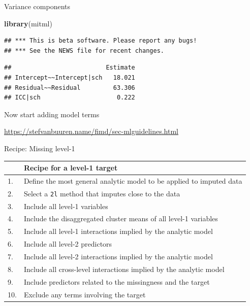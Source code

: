 \documentclass[ignorenonframetext,aspectratio=43]{beamer}
\newenvironment{Shaded}{\begin{snugshade}}{\end{snugshade}}
\newcommand{\DataTypeTok}[1]{\textcolor[rgb]{0.13,0.29,0.53}{#1}}
\newcommand{\KeywordTok}[1]{\textcolor[rgb]{0.13,0.29,0.53}{\textbf{#1}}}
\newcommand{\NormalTok}[1]{#1}
\newcommand{\OperatorTok}[1]{\textcolor[rgb]{0.81,0.36,0.00}{\textbf{#1}}}
\newcommand{\OtherTok}[1]{\textcolor[rgb]{0.56,0.35,0.01}{#1}}
\begin{document}
\begin{frame}[fragile]{Variance components}
\protect\hypertarget{variance-components}{}

\begin{Shaded}
\begin{Highlighting}[]
\KeywordTok{library}\NormalTok{(mitml)}
\end{Highlighting}
\end{Shaded}

\begin{verbatim}
## *** This is beta software. Please report any bugs!
## *** See the NEWS file for recent changes.
\end{verbatim}

\begin{Shaded}
\end{Shaded}

\begin{verbatim}
##                          Estimate
## Intercept~~Intercept|sch   18.021
## Residual~~Residual         63.306
## ICC|sch                     0.222
\end{verbatim}

\end{frame}

\begin{frame}{Now start adding model terms}
\protect\hypertarget{now-start-adding-model-terms}{}

\url{https://stefvanbuuren.name/fimd/sec-mlguidelines.html}

\end{frame}

\begin{frame}[fragile]{Recipe: Missing level-1}
\protect\hypertarget{recipe-missing-level-1}{}

\begin{longtable}[]{@{}ll@{}}
\toprule
& Recipe for a level-1 target\tabularnewline
\midrule
\endhead
1. & Define the most general analytic model to be applied to imputed
data\tabularnewline
2. & Select a \texttt{2l} method that imputes close to the
data\tabularnewline
3. & Include all level-1 variables\tabularnewline
4. & Include the disaggregated cluster means of all level-1
variables\tabularnewline
5. & Include all level-1 interactions implied by the analytic
model\tabularnewline
6. & Include all level-2 predictors\tabularnewline
7. & Include all level-2 interactions implied by the analytic
model\tabularnewline
8. & Include all cross-level interactions implied by the analytic
model\tabularnewline
9. & Include predictors related to the missingness and the
target\tabularnewline
10. & Exclude any terms involving the target\tabularnewline
\bottomrule
\end{longtable}

\end{frame}
\end{document}
